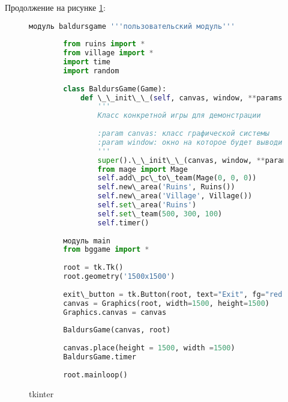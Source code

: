 Продолжение на рисунке \ref{tkinter3:image}:
\begin{figure}[H]
	\begin{lstlisting}[language=Python]
		модуль baldursgame '''пользовательский модуль'''
		
		from ruins import *
		from village import *
		import time
		import random
		
		class BaldursGame(Game):
			def \_\_init\_\_(self, canvas, window, **params):
				'''
				Класс конкретной игры для демонстрации
				
				:param canvas: класс графической системы
				:param window: окно на которое будет выводится игра
				'''
				super().\_\_init\_\_(canvas, window, **params)
				from mage import Mage
				self.add\_pc\_to\_team(Mage(0, 0, 0))
				self.new\_area('Ruins', Ruins())
				self.new\_area('Village', Village())
				self.set\_area('Ruins')
				self.set\_team(500, 300, 100)
				self.timer()
		
		модуль main
		from bggame import *
		
		root = tk.Tk()
		root.geometry('1500x1500')
		
		exit\_button = tk.Button(root, text="Exit", fg="red", command=root.destroy)
		canvas = Graphics(root, width=1500, height=1500)
		Graphics.canvas = canvas
		
		BaldursGame(canvas, root)
		
		canvas.place(height = 1500, width =1500)
		BaldursGame.timer
		
		root.mainloop()
	\end{lstlisting}  
	\caption{tkinter}
	\label{tkinter3:image}
\end{figure}

